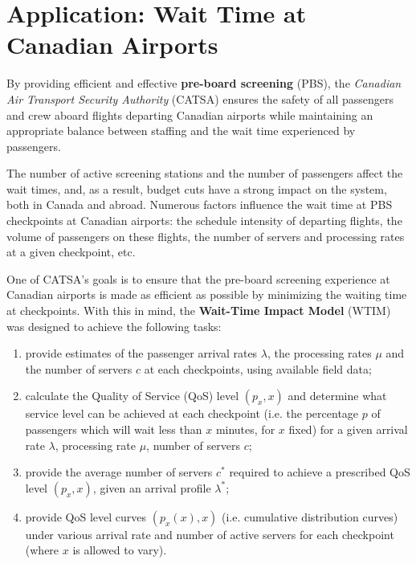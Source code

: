 \section{Application: Wait Time at Canadian Airports}
By providing efficient and effective \textbf{pre-board screening} (PBS), the \textit{Canadian Air Transport Security Authority} (CATSA) ensures the safety of all passengers and crew aboard flights departing Canadian airports while maintaining an appropriate balance between staffing and the wait time experienced by passengers. \par The number of active screening stations and the number of passengers affect the wait times, and, as a result, budget cuts have a strong impact on the system, both in Canada and abroad.\newl
Numerous factors influence the wait time at PBS checkpoints at Canadian airports: the schedule intensity of departing flights, the volume of passengers on these flights, the number of servers and processing rates at a given checkpoint, etc. \par One of CATSA's goals is to ensure that the pre-board screening experience at Canadian airports is made as efficient as possible by minimizing the waiting time at checkpoints. With this in mind, the \textbf{Wait-Time Impact Model} (WTIM) was designed to achieve the following tasks: 
\begin{enumerate}[noitemsep]
\item provide estimates of the passenger arrival rates $\lambda$, the processing rates $\mu$ and the number of servers $c$ at each checkpoints, using available field data;
\item calculate the Quality of Service (QoS) level $(p_x,x)$  and determine what service level can be achieved at each checkpoint (i.e. the percentage $p$ of passengers which will wait less than $x$ minutes, for $x$ fixed) for a given arrival rate $\lambda$, processing rate $\mu$, number of servers $c$;
\item provide the average number of servers $c^*$ required to achieve a prescribed QoS level $(p_x,x)$, given an arrival profile $\lambda^*$;
\item provide QoS level curves $(p_x (x),x)$ (i.e. cumulative distribution curves) under various arrival rate and number of active servers for each checkpoint (where $x$ is allowed to vary).\end{enumerate}

